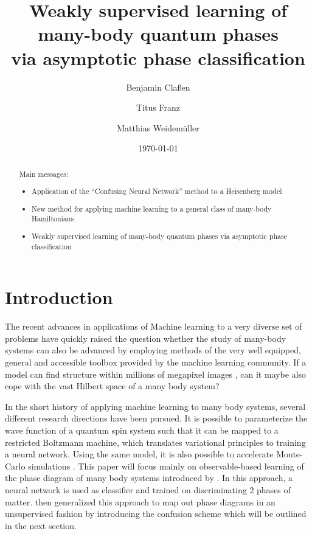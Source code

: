 \documentclass[prl, reprint, twocolumn]{revtex4-1}
\begin{document}
	\title{Weakly supervised learning of many-body quantum phases \\ via asymptotic phase classification}
	\date{\today}
	\author{Benjamin Claßen}
	\author{Titus Franz}
	\author{Matthias Weidemüller}
	\begin{abstract}
		
		Main messages:
		\begin{itemize}
			\item Application of the “Confusing Neural Network” method to a Heisenberg model
			\item New method for applying machine learning to a general class of many-body Hamiltonians
			\item Weakly supervised learning of many-body quantum phases via asymptotic phase classification
		\end{itemize}
		
	\end{abstract}
	\maketitle
	
	\section{Introduction}

	The recent advances in applications of Machine learning to a very diverse set of problems have quickly raised the question whether the study of many-body systems can also be advanced by employing methods of the very well equipped, general and accessible toolbox provided by the machine learning community.
	If a model can find structure within millions of megapixel images \cite{Needed}, can it maybe also cope with the vast Hilbert space of a many body system?
	
	In the short history of applying machine learning to many body systems, several different research directions have been pursued. It is possible to parameterize the wave function of a quantum spin system such that it can be mapped to a restricted Boltzmann machine, which translates variational principles to training a neural network\cite{Carleo2016a}. Using the same model, it is also possible to accelerate Monte-Carlo simulations \cite{Huang2017}. This paper will focus mainly on observable-based learning of the phase diagram of many body systems introduced by \cite{Carrasquilla2017}. In this approach, a neural network is used as classifier and trained on discriminating 2 phases of matter. \cite{Nieuwenburg2017} then generalized this approach to map out phase diagrams in an unsupervised fashion by introducing the confusion scheme which will be outlined in the next section.
	
\end{document}
